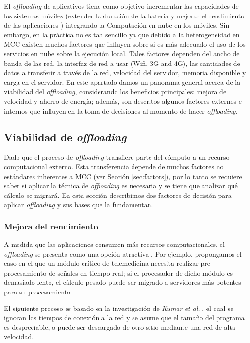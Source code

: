 El \emph{offloading} de aplicativos tiene como objetivo incrementar las capacidades de los sistemas móviles (extender la duración de la batería 
y mejorar el rendimiento de las aplicaciones \cite{5445167}) integrando la Computación en nube en los móviles. 
Sin embargo, en la práctica no es tan sencillo ya que debido a la heterogeneidad en MCC existen muchos factores que influyen sobre 
si es más adecuado el uso de los servicios en nube sobre la ejecución local. Tales factores dependen del ancho de banda de las red,
la interfaz de red a usar (Wifi, 3G and 4G), las cantidades de datos a transferir a través de la red, velocidad del servidor, memoria 
disponible y carga en el servidor. En este apartado damos un panorama general acerca de la viabilidad del \textit{offloading}, 
considerando los beneficios principales: mejora de velocidad y ahorro de energía; además, 
son descritos algunos factores externos e internos que influyen en la toma de decisiones al momento de hacer \emph{offloading}.


\subsection{Viabilidad de \textit{offloading} }
\label{subsec:offloadingdecision}

Dado que el proceso de \textit{offloading} transfiere parte del cómputo a un recurso computacional externo. Esta transferencia
depende de muchos factores no estándares inherentes a MCC (ver Sección \ref{sec:factors}), por lo tanto 
se requiere saber si aplicar la técnica de \textit{offloading} es necesaria y se tiene que analizar qué cálculo se migrará. 
En esta sección describimos dos factores de decisión  para aplicar \textit{offloading} y sus bases que la fundamentan. 

\subsubsection{Mejora del rendimiento}

A medida que las aplicaciones consumen más recursos computacionales, el \emph{offloading} se presenta como una opción atractiva 
\cite{balan2006simplifying} . Por ejemplo, propongamos el caso en el que un módulo crítico de telemedicina \cite{ryu2012telemedicine}
necesita realizar pre-procesamiento de señales en tiempo real; si el procesador de dicho módulo es demasiado lento, el cálculo pesado
puede ser migrado a servidores más potentes para su procesamiento.

El siguiente proceso es basado en la
investigación de \textit{Kumar et al.} \cite{raey}, el cual se ignoran los tiempos de conexión a la red y se asume que el tamaño del
programa es despreciable, o puede ser descargado de otro sitio mediante una red de alta velocidad. 

